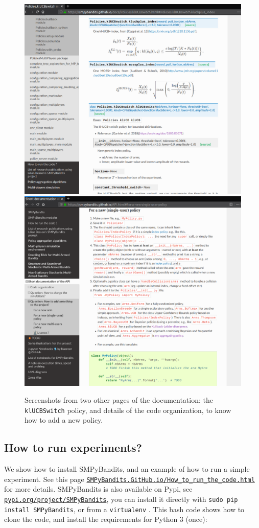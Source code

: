 \begin{figure}[h!]  %
    \centering
	\includegraphics[width=0.495\linewidth]{overview_documentation_3.png}
	\includegraphics[width=0.495\linewidth]{overview_documentation_4.png}
	\caption{Screenshots from two other pages of the documentation: the \texttt{klUCBSwitch} policy, and details of the code organization, to know how to add a new policy.}
	\label{fig:3:twoMoreScreenshotsOfTheDocumentation}
\end{figure}


\subsection{How to run experiments?}

We show how to install SMPyBandits, and an example of how to run a simple experiment.
See this page \texttt{\href{https://SMPyBandits.GitHub.io/How_to_run_the_code.html}{SMPyBandits.GitHub.io/How\_to\_run\_the\_code.html}} for more details.
SMPyBandits is also available on Pypi, see \texttt{\href{https://pypi.org/project/SMPyBandits/}{pypi.org/project/SMPyBandits}}, you can install it directly with \texttt{sudo pip install SMPyBandits}, or from a \texttt{virtualenv} \cite{virtualenv}.
This bash code shows how to clone the code, and install the requirements for Python 3 (once):

